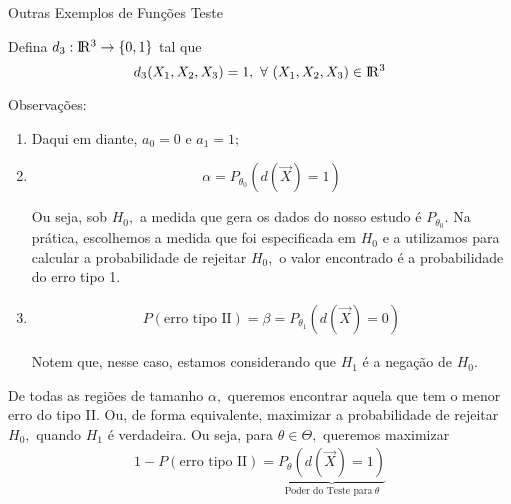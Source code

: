 \documentclass[12pt]{beamer}
\begin{document}
\begin{frame}{Outras Exemplos de Funções Teste}
\begin{block}{}
\justifying
    Defina $d_{3}:\rm I\!R^{3}\rightarrow \{0,1\}$ tal que 
    \[
d_{3}(X_{1},X_{2},X_{3}) = 1,~\forall ~(X_{1},X_{2},X_{3})\in \rm I\!R^{3}
\]
\end{block}
\end{frame}

\begin{frame}{}
\begin{block}{Observações:}
\justifying
\begin{enumerate}
\item Daqui em diante, $a_{0}=0$ e $a_{1}=1;$
\pause
    \item $$\alpha=P_{\theta_{0}}(d(\vec{X})=1)$$
\pause
\begin{block}{}
Ou seja, sob $H_{0},$ a medida que gera os dados do nosso estudo é $P_{\theta_{0}}.$ Na prática, escolhemos a medida que foi especificada em $H_{0}$ e a utilizamos para calcular a probabilidade de rejeitar $H_{0},$ o valor encontrado é a probabilidade do erro tipo 1.    
\end{block}
\pause
\item \begin{align*}
    P(\text{erro tipo II})=\beta=P_{\theta_{1}}(d(\vec{X})=0)
\end{align*}
\pause
\vspace{-0.5cm}
\begin{block}{}
\justifying
Notem que, nesse caso, estamos considerando que $H_{1}$ é a negação de $H_{0}.$
\end{block}
\end{enumerate}
\end{block}
\end{frame}

\begin{frame}{}
\begin{block}{}
\justifying
De todas as regiões de tamanho $\alpha,$ queremos encontrar aquela que tem o menor erro do tipo II. Ou, de forma equivalente, maximizar a probabilidade de rejeitar $H_{0},$ quando $H_{1}$ é verdadeira. Ou seja, para $\theta\in\Theta,$ queremos maximizar 
\begin{align*}
    1-P(\text{erro tipo II})=\underbrace{P_{\theta}(d(\vec{X})=1)}_{\text{Poder do Teste para}~\theta}
\end{align*}
\end{block}
\end{frame}
\end{document}
